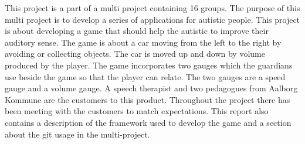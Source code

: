 This project is a part of a multi project containing 16 groups.
The purpose of this multi project is to develop a series of applications for autistic people.
This project is about developing a game that should help the autistic to improve their auditory sense.
The game is about a car moving from the left to the right by avoiding or collecting objects.
The car is moved up and down by volume produced by the player.
The game incorporates two gauges which the guardians use beside the game so that the player can relate.
The two gauges are a speed gauge and a volume gauge.
A speech therapist and two pedagogues from Aalborg Kommune are the customers to this product.
Throughout the project there has been meeting with the customers to match expectations.
This report also contains a description of the framework used to develop the game and a section about the git usage in the multi-project.
